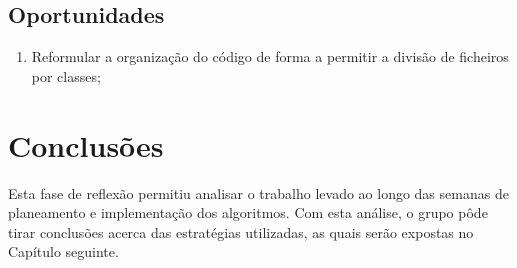 \subsection{Oportunidades}
\label{ssec::reflexao:critica:oportunidades}

\begin{enumerate}
	\item Reformular a organização do código de forma a permitir a divisão de ficheiros por classes;
\end{enumerate}

\section{Conclusões}
\label{sec::reflexao:conclusao}

Esta fase de reflexão permitiu analisar o trabalho levado ao longo das semanas de planeamento e implementação dos algoritmos. Com esta análise, o grupo pôde tirar conclusões acerca das estratégias utilizadas, as quais serão expostas no Capítulo seguinte.